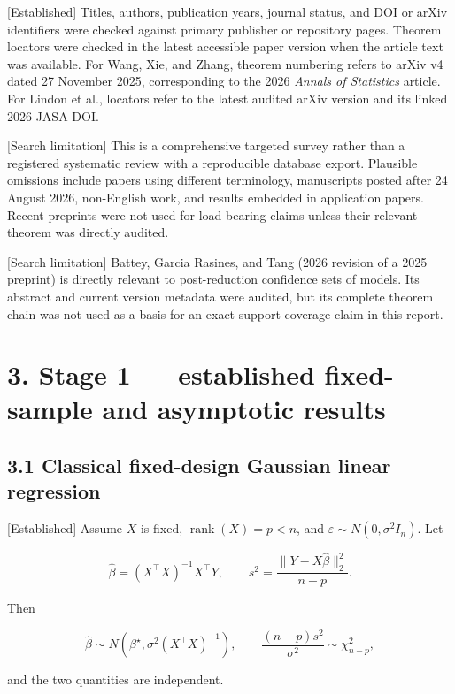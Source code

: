 \documentclass[
  english,
  11pt,
  a4paper,
]{article}
\begin{document}
{[}Established{]} Titles, authors, publication years, journal status,
and DOI or arXiv identifiers were checked against primary publisher or
repository pages. Theorem locators were checked in the latest accessible
paper version when the article text was available. For Wang, Xie, and
Zhang, theorem numbering refers to arXiv v4 dated 27 November 2025,
corresponding to the 2026 \emph{Annals of Statistics} article. For
Lindon et al., locators refer to the latest audited arXiv version and
its linked 2026 JASA DOI.

{[}Search limitation{]} This is a comprehensive targeted survey rather
than a registered systematic review with a reproducible database export.
Plausible omissions include papers using different terminology,
manuscripts posted after 24 August 2026, non-English work, and results
embedded in application papers. Recent preprints were not used for
load-bearing claims unless their relevant theorem was directly audited.

{[}Search limitation{]} Battey, Garcia Rasines, and Tang (2026 revision
of a 2025 preprint) is directly relevant to post-reduction confidence
sets of models. Its abstract and current version metadata were audited,
but its complete theorem chain was not used as a basis for an exact
support-coverage claim in this report.

\section{3. Stage 1 --- established fixed-sample and asymptotic
results}\label{stage-1-established-fixed-sample-and-asymptotic-results}

\subsection{3.1 Classical fixed-design Gaussian linear
regression}\label{classical-fixed-design-gaussian-linear-regression}

{[}Established{]} Assume $X$ is fixed, $\operatorname{rank}(X)=p<n$,
and $\varepsilon\sim N(0,\sigma^2I_n)$. Let

$$
\widehat\beta=(X^\top X)^{-1}X^\top Y,
\qquad
s^2=\frac{\lVert Y-X\widehat\beta\rVert_2^2}{n-p}.
$$

Then

$$
\widehat\beta\sim N\!\left(\beta^\star,\sigma^2(X^\top X)^{-1}\right),
\qquad
\frac{(n-p)s^2}{\sigma^2}\sim\chi^2_{n-p},
$$

and the two quantities are independent.
\end{document}
